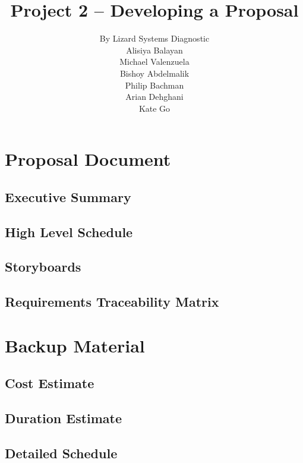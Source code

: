\documentclass{article}
\title{Project 2 – Developing a Proposal}
\author{
By Lizard Systems Diagnostic\\
Alisiya Balayan\\
Michael Valenzuela\\
Bishoy Abdelmalik\\
Philip Bachman\\
Arian Dehghani\\
Kate Go
}
\begin{document}
\maketitle
\tableofcontents

\section{Proposal Document}
\subsection{Executive Summary}
\subsection{High Level Schedule}
\subsection{Storyboards}
\subsection{Requirements Traceability Matrix}
\section{Backup Material}
\subsection{Cost Estimate} 
\subsection{Duration Estimate} 
\subsection{Detailed Schedule}
\end{document}
